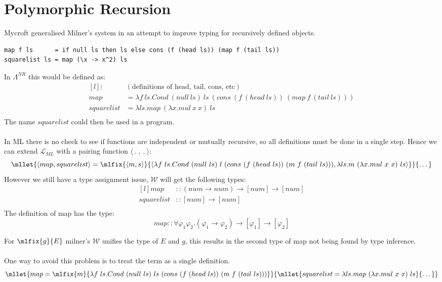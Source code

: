 \section{Polymorphic Recursion}
Mycroft generalised Milner's system in an attempt to improve typing for recursively defined objects.
\begin{verbatim}
map f ls      = if null ls then ls else cons (f (head ls)) (map f (tail ls))
squarelist ls = map (\x -> x^2) ls
\end{verbatim}
In $\Lambda^{NR}$ this would be defined as:
\[\begin{matrix*}[l]
		\vdots & (\text{definitions of head, tail, cons, etc}) \\
		map & = \lambda f \ ls . Cond \ (null \ ls) \ ls \ (cons \ (f \ (head \ ls)) \ (map \ f \ (tail \ ls))) \\
		squarelist & = \lambda ls . map \ (\lambda x . mul \ x \ x) \ ls \\
	\end{matrix*}\]
The name $squarelist$ could then be used in a program.
\\
\\ In ML there is no check to see if functions are independent or mutually recursive, so all definitions must be done in a single step.
Hence we can extend $\mathcal{L}_{ML}$ with a pairing function $\langle \ . \ , \ . \ \rangle$:
\[\mllet{\langle map, squarelist \rangle = \mlfix{\langle m, s \rangle}{\langle \lambda f \ ls . Cond \ (null \ ls) \ l \ (cons \ (f \ (head \ ls)) \ (m \ f \ (tail \ ls))), \lambda ls . m \ (\lambda x . mul \ x \ x) \ ls\rangle}}{\dots}\]
However we still have a type assignment issue, $\mathcal{W}$ will get the following types:
\[\begin{matrix*}[l]
		map & :: (num \to num) \to [num] \to [num] \\
		squarelist & :: [num] \to [num] \\
	\end{matrix*}\]
The definition of map has the type:
\[map :: \forall \varphi_1 \varphi_2 . (\varphi_1 \to \varphi_2) \to [\varphi_1] \to [\varphi_2]\]

For $\mlfix{g}{E}$ milner's $\mathcal{W}$ unifies the type of $E$ and $g$, this results in the second type of map not being found by type inference.
\\
\\ One way to avoid this problem is to treat the term as a single definition.
\[\mllet{map = \mlfix{m}{\lambda f \ ls . Cond \ (null \ ls) \ ls \ (cons \ (f \ (head \ ls)) \ (m \ f \ (tail \ ls)))}}{\mllet{squarelist = \lambda ls . map \ (\lambda x . mul \ x \ x) \ ls}{\dots}}\]


